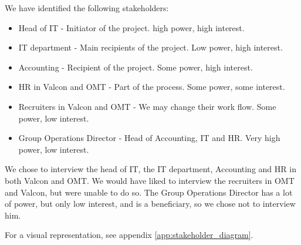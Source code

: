 We have identified the following stakeholders:
\begin{itemize}
\item Head of IT - Initiator of the project. high power, high interest.
\item IT department - Main recipients of the project. Low power, high interest.
\item Accounting - Recipient of the project. Some power, high interest.
\item HR in Valcon and OMT - Part of the process. Some power, some interest.
\item Recruiters in Valcon and OMT - We may change their work flow. Some power, low interest.
\item Group Operations Director - Head of Accounting, IT and HR. Very high power, low interest.
\end{itemize}
We chose to interview the head of IT, the IT department, Accounting and HR in both Valcon and OMT. 
We would have liked to interview the recruiters in OMT and Valcon, but were unable to do so.
The Group Operations Director has a lot of power, but only low interest, and is a beneficiary, so we chose not to interview him.

For a visual representation, see appendix \ref{app:stakeholder_diagram}.